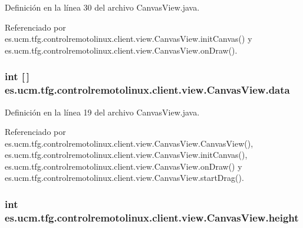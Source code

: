 Definición en la línea 30 del archivo Canvas\-View.\-java.



Referenciado por es.\-ucm.\-tfg.\-controlremotolinux.\-client.\-view.\-Canvas\-View.\-init\-Canvas() y es.\-ucm.\-tfg.\-controlremotolinux.\-client.\-view.\-Canvas\-View.\-on\-Draw().

\hypertarget{classes_1_1ucm_1_1tfg_1_1controlremotolinux_1_1client_1_1view_1_1CanvasView_a379683c9544af8c623b8f49cf3062b88}{
\subsubsection[{data}]{\setlength{\rightskip}{0pt plus 5cm}int \mbox{[}$\,$\mbox{]} es.\-ucm.\-tfg.\-controlremotolinux.\-client.\-view.\-Canvas\-View.\-data\hspace{0.3cm}{\ttfamily [private]}}}\label{classes_1_1ucm_1_1tfg_1_1controlremotolinux_1_1client_1_1view_1_1CanvasView_a379683c9544af8c623b8f49cf3062b88}


Definición en la línea 19 del archivo Canvas\-View.\-java.



Referenciado por es.\-ucm.\-tfg.\-controlremotolinux.\-client.\-view.\-Canvas\-View.\-Canvas\-View(), es.\-ucm.\-tfg.\-controlremotolinux.\-client.\-view.\-Canvas\-View.\-init\-Canvas(), es.\-ucm.\-tfg.\-controlremotolinux.\-client.\-view.\-Canvas\-View.\-on\-Draw() y es.\-ucm.\-tfg.\-controlremotolinux.\-client.\-view.\-Canvas\-View.\-start\-Drag().

\hypertarget{classes_1_1ucm_1_1tfg_1_1controlremotolinux_1_1client_1_1view_1_1CanvasView_a68e85caf0a76be8f32eb052facfd309f}{
\subsubsection[{height}]{\setlength{\rightskip}{0pt plus 5cm}int es.\-ucm.\-tfg.\-controlremotolinux.\-client.\-view.\-Canvas\-View.\-height\hspace{0.3cm}{\ttfamily [private]}}}\label{classes_1_1ucm_1_1tfg_1_1controlremotolinux_1_1client_1_1view_1_1CanvasView_a68e85caf0a76be8f32eb052facfd309f}


